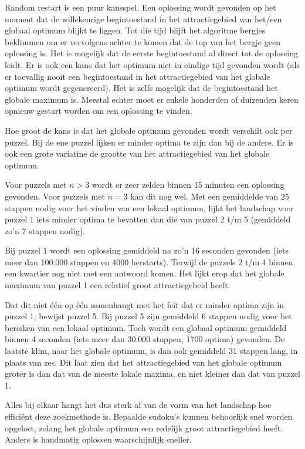 \documentclass[]{report}
\begin{document}
Random restart is een puur kansspel. Een oplossing wordt gevonden op het moment dat de willekeurige begintoestand in het attractiegebied van het/een globaal optimum blijkt te liggen. Tot die tijd blijft het algoritme bergjes beklimmen om er vervolgens achter te komen dat de top van het bergje geen oplossing is. Het is mogelijk dat de eerste begintoestand al direct tot de oplossing leidt. Er is ook een kans dat het optimum niet in eindige tijd gevonden wordt (als er toevallig nooit een begintoestand in het attractiegebied van het globale optimum wordt gegenereerd). Het is zelfs mogelijk dat de begintoestand het globale maximum is. Meestal echter moet er enkele honderden of duizenden keren opnieuw gestart worden om een oplossing te vinden.

Hoe groot de kans is dat het globale optimum gevonden wordt verschilt ook per puzzel. Bij de ene puzzel lijken er minder optima te zijn dan bij de andere. Er is ook een grote variatine de grootte van het attractiegebied van het globale optimum.

Voor puzzels met $n > 3$ wordt er zeer zelden binnen 15 minuten een oplossing gevonden. Voor puzzels met $n=3$ kan dit nog wel. Met een gemiddelde van 25 stappen nodig voor het vinden van een lokaal optimum, lijkt het landschap voor puzzel 1 iets minder optima te bevatten dan die van puzzel 2 t/m 5 (gemiddeld zo'n 7 stappen nodig).

Bij puzzel 1 wordt een oplossing gemiddeld na zo'n 16 seconden gevonden (iets meer dan 100.000 stappen en 4000 herstarts). Terwijl de puzzels 2 t/m 4 binnen een kwartier nog niet met een antwoord komen. Het lijkt erop dat het globale maximum van puzzel 1 een relatief groot attractiegebeid heeft.

Dat dit niet \'{e}\'{e}n op \'{e}\'{e}n samenhangt met het feit dat er minder optima zijn in puzzel 1, bewijst puzzel 5. Bij puzzel 5 zijn gemiddeld 6 stappen nodig voor het bereiken van een lokaal optimum. Toch wordt een globaal optimum gemiddeld binnen 4 seconden (iets meer dan 30.000 stappen, 1700 optima) gevonden. De laatste klim, naar het globale optimum, is dan ook gemiddeld 31 stappen lang, in plaats van zes. Dit laat zien dat het attractiegebied van het globale optimum groter is dan dat van de meeste lokale maxima, en niet kleiner dan dat van puzzel 1.

Alles bij elkaar hangt het dus sterk af van de vorm van het landschap hoe effici\"{e}nt deze zoekmethode is. Bepaalde sudoku's kunnen behoorlijk snel worden opgelost, zolang het globale optimum een redelijk groot attractiegebied heeft. Anders is handmatig oplossen waarschijnlijk sneller.
\end{document}

